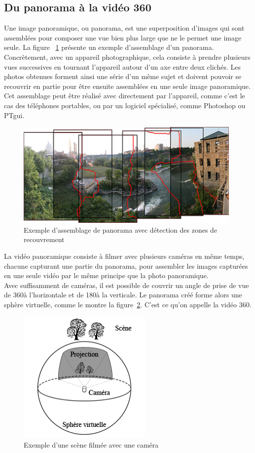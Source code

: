 \subsection{Du panorama à la vidéo 360}
Une image panoramique, ou panorama, est une superposition d'images qui sont assemblées
pour composer une vue bien plus large que ne le permet une image seule. La figure~ 
\ref{rochester-ny} présente un exemple d'assemblage d'un panorama.\\
Concrètement, avec un appareil photographique, cela consiste à prendre plusieurs vues
successives en tournant l'appareil autour d'un axe entre deux clichés. 
Les photos obtenues forment ainsi une série d'un même sujet et doivent pouvoir 
se recouvrir en partie pour être ensuite assemblées en une seule image panoramique. 
Cet assemblage peut être réalisé avec directement par l'appareil, comme c'est le cas des 
téléphones portables, ou par un logiciel spécialisé, comme Photoshop\cite{photomerge} 
ou PTgui\cite{PTgui}.
\begin{figure}
  \centering
  \includegraphics[width=11cm]{images/rochester-ny.png}
  \caption{Exemple d'assemblage de panorama avec détection des zones de recouvrement\cite{RochesterNY}}
  \label{rochester-ny}
\end{figure}
\newline
La vidéo panoramique consiste à filmer avec plusieurs caméras en même temps, chacune
capturant une partie du panorama, pour assembler les images capturées en une seule
vidéo par le même principe que la photo panoramique.\\
Avec suffisamment de caméras, il est possible de couvrir un angle de prise de vue 
de 360\degree à l'horizontale et de 180\degree à la verticale. Le panorama créé
forme alors une sphère virtuelle, comme le montre la figure~\ref{camera-projection}. 
C'est ce qu'on appelle la vidéo 360.
\begin{figure}
  \centering
  \includegraphics[width=6.5cm]{images/camera-projection.png}
  \caption{Exemple d'une scène filmée avec une caméra}
  \label{camera-projection}
\end{figure}
